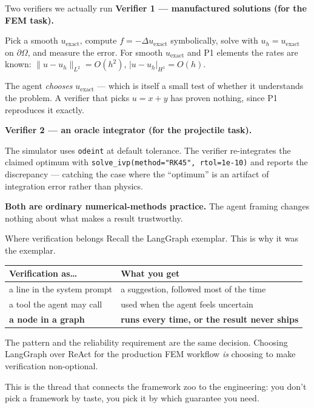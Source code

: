 \documentclass[aspectratio=169,10pt]{beamer}
\newcommand{\code}[1]{\texttt{\small #1}}
\newcommand{\hl}[1]{\textcolor{accent}{\textbf{#1}}}
\begin{document}
\begin{frame}{Two verifiers we actually run}
\textbf{Verifier 1 --- manufactured solutions (for the FEM task).}

Pick a smooth $u_\text{exact}$, compute $f = -\Delta u_\text{exact}$
symbolically, solve with $u_h = u_\text{exact}$ on $\partial\Omega$, and measure
the error. For smooth $u_\text{exact}$ and P1 elements the rates are known:
$\|u-u_h\|_{L^2} = O(h^2)$, $|u-u_h|_{H^1} = O(h)$.

{\small The agent \emph{chooses} $u_\text{exact}$ --- which is itself a small
test of whether it understands the problem. A verifier that picks
$u = x + y$ has proven nothing, since P1 reproduces it exactly.}

\vspace{1em}
\textbf{Verifier 2 --- an oracle integrator (for the projectile task).}

The simulator uses \code{odeint} at default tolerance. The verifier re-integrates
the claimed optimum with \code{solve\_ivp(method="RK45", rtol=1e-10)} and reports
the discrepancy --- catching the case where the ``optimum'' is an artifact of
integration error rather than physics.

\vspace{1em}
\begin{center}
\hl{Both are ordinary numerical-methods practice.} The agent framing changes
nothing about what makes a result trustworthy.
\end{center}
\end{frame}

\begin{frame}{Where verification belongs}
Recall the LangGraph exemplar. This is why it was the exemplar.

\vspace{0.8em}
\begin{center}
\begin{tabular}{@{}ll@{}}
\toprule
\textbf{Verification as\ldots} & \textbf{What you get} \\
\midrule
a line in the system prompt & a suggestion, followed most of the time \\
a tool the agent may call & used when the agent feels uncertain \\
\hl{a node in a graph} & \hl{runs every time, or the result never ships} \\
\bottomrule
\end{tabular}
\end{center}

\vspace{1.2em}
The pattern and the reliability requirement are the same decision.
Choosing LangGraph over ReAct for the production FEM workflow \emph{is}
choosing to make verification non-optional.

\vspace{1em}
\begin{center}\small\color{gray}
This is the thread that connects the framework zoo to the engineering:
you don't pick a framework by taste, you pick it by which guarantee you need.
\end{center}
\end{frame}
\end{document}
